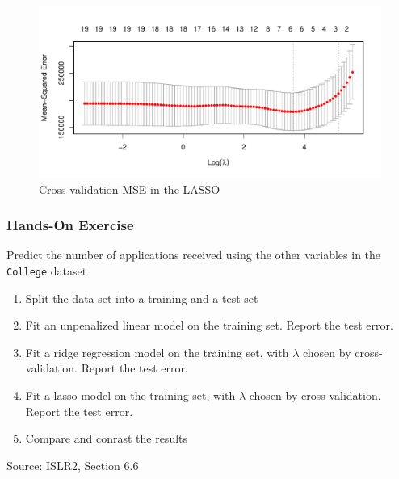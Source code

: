 \begin{figure}
\centering
\includegraphics[width=.9\textwidth]{crossvalidated_lasso.pdf}

\caption{Cross-validation MSE in the LASSO}
\label{fig:lassocv}
\end{figure}

\begin{tcolorbox}[colback=code]
\subsubsection*{Hands-On Exercise} 

Predict the number of applications received using the other variables in the \texttt{College} dataset
  \begin{enumerate} 
      \item Split the data set into a training and a test set
      \item Fit an unpenalized linear model on the training set. Report the test error.
      \item Fit a ridge regression model on the training set, with $\lambda$ chosen by cross-validation. Report the test error.
      \item Fit a lasso model on the training set, with $\lambda$ chosen by cross-validation. Report the test error.
      \item Compare and conrast the results
  \end{enumerate}

\footnotesize Source: ISLR2, Section 6.6 \normalsize
\end{tcolorbox}


